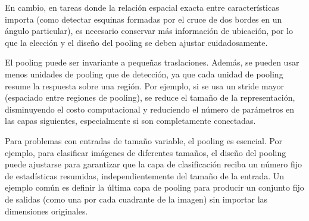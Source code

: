 En cambio, en tareas donde la relación espacial exacta entre características importa (como detectar esquinas formadas por el cruce de dos bordes en un ángulo particular), es necesario conservar más información de ubicación, por lo que la elección y el diseño del pooling se deben ajustar cuidadosamente.

El pooling puede ser invariante a pequeñas traslaciones. Además, se pueden usar menos unidades de pooling que de detección, ya que cada unidad de pooling resume la respuesta sobre una región. Por ejemplo, si se usa un stride mayor (espaciado entre regiones de pooling), se reduce el tamaño de la representación, disminuyendo el costo computacional y reduciendo el número de parámetros en las capas siguientes, especialmente si son completamente conectadas.

Para problemas con entradas de tamaño variable, el pooling es esencial. Por ejemplo, para clasificar imágenes de diferentes tamaños, el diseño del pooling puede ajustarse para garantizar que la capa de clasificación reciba un número fijo de estadísticas resumidas, independientemente del tamaño de la entrada. Un ejemplo común es definir la última capa de pooling para producir un conjunto fijo de salidas (como una por cada cuadrante de la imagen) sin importar las dimensiones originales.


\endinput
